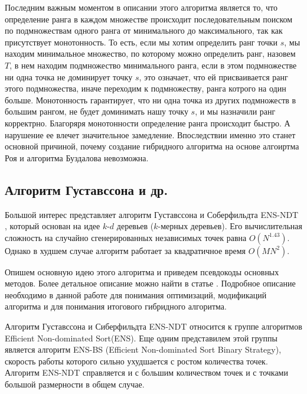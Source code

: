 Последним важным моментом в описании этого алгоритма является то, что определение ранга в каждом множестве происходит последовательным поиском по подмножествам одного ранга от минимального до максимального, так как присутствует монотонность. То есть, если мы хотим определить ранг точки $s$, мы находим минимальное множество, по которому можно определить ранг, назовем $T$, в нем находим подмножество минимального ранга, если в этом подмножестве ни одна точка не доминирует точку $s$, это означает, что ей присваивается ранг этого подмножества, иначе переходим к подмножеству, ранга котрого на один больше. Монотонность гарантирует, что ни одна точка из других подмножеств в большим рангом, не будет доминимать нашу точку $s$, и мы назначили ранг корректрно. Благоряря монотонности определение ранга происходит быстро. А нарушение ее влечет значительное замедление. Впоследствии именно это станет основной причиной, почему создание гибридного алгоритма на основе алгоиртма Роя и алгоритма Буздалова невозможна. 

\subsection{Алгоритм Густавссона и др.}

Большой интерес представляет алгоритм Густавссона и Соберфильдта ENS-NDT \cite{Gustavsson}, который основан на идее $k$-$d$ деревьев ($k$-мерных деревьев). Его вычислительная сложность на случайно сгенерированных независимых точек равна $O(N^{1.43})$. Однако в худшем случае алгоритм работает за квадратичное время $O(MN^2)$.

Опишем основную идею этого алгоритма и приведем псевдокоды основных методов. Более детальное описание можно найти в статье \cite{Gustavsson}. Подробное описание необходимо в данной работе для понимания оптимизаций, модификаций алгоритма и для понимания итогового гибридного алгоритма.

Алгоритм Густавссона и Сиберфильдта ENS-NDT относится к группе алгоритмов Efficient Non-dominated Sort(ENS). Еще одним представилем этой группы является алгоритм ENS-BS (Efficient Non-dominated Sort Binary Strategy), скорость работы которого сильно ухудшается с ростом количества точек. Алгоритм ENS-NDT справляется и с большим количеством точек и с точками большой размерности в общем случае.

